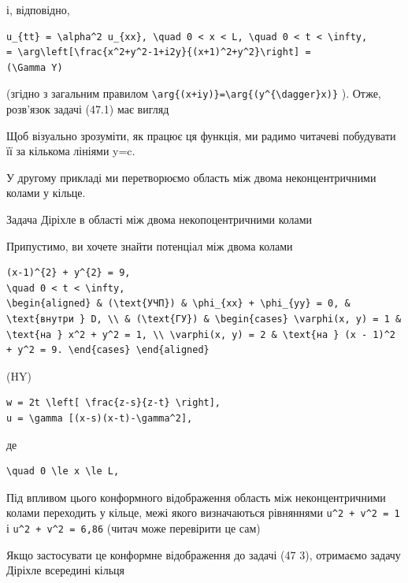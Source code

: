 \documentclass[
  ukrainian,
]{article}
\begin{document}
і, відповідно,

\begin{verbatim}
u_{tt} = \alpha^2 u_{xx}, \quad 0 < x < L, \quad 0 < t < \infty,
= \arg\left[\frac{x^2+y^2-1+i2y}{(x+1)^2+y^2}\right] =
(\Gamma Y)
\end{verbatim}

(згідно з загальним правилом
\texttt{\textbackslash{}arg\{(x+iy)\}=\textbackslash{}arg\{(y\^{}\{\textbackslash{}dagger\}x)\}}
). Отже, розв'язок задачі (47.1) має вигляд

Щоб візуально зрозуміти, як працює ця функція, ми радимо читачеві
побудувати її за кількома лініями y=c.

У другому прикладі ми перетворюємо область між двома неконцентричними
колами у кільце.

Задача Діріхле в області між двома некопоцентричними колами

Припустимо, ви хочете знайти потенціал між двома колами

\begin{verbatim}
(x-1)^{2} + y^{2} = 9,
\quad 0 < t < \infty,
\begin{aligned} & (\text{УЧП}) & \phi_{xx} + \phi_{yy} = 0, & \text{внутри } D, \\ & (\text{ГУ}) & \begin{cases} \varphi(x, y) = 1 & \text{на } x^2 + y^2 = 1, \\ \varphi(x, y) = 2 & \text{на } (x - 1)^2 + y^2 = 9. \end{cases} \end{aligned}
\end{verbatim}

(HY)

\begin{verbatim}
w = 2t \left[ \frac{z-s}{z-t} \right],
u = \gamma [(x-s)(x-t)-\gamma^2],
\end{verbatim}

де

\begin{verbatim}
\quad 0 \le x \le L,
\end{verbatim}

Під впливом цього конформного відображення область між неконцентричними
колами переходить у кільце, межі якого визначаються рівняннями
\texttt{u\^{}2\ +\ v\^{}2\ =\ 1} і \texttt{u\^{}2\ +\ v\^{}2\ =\ 6,86}
(читач може перевірити це сам)

Якщо застосувати це конформне відображення до задачі (47 3), отримаємо
задачу Діріхле всередині кільця
\end{document}
